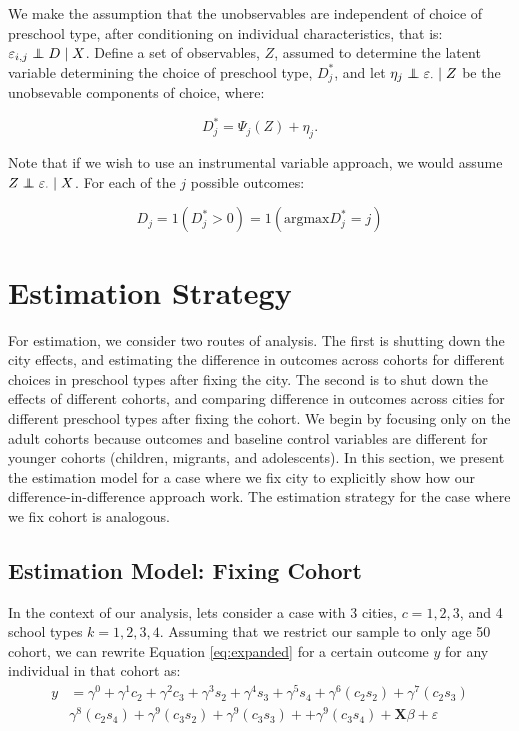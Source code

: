 \documentclass[11pt]{article}
\newcommand\independent{\protect\mathpalette{\protect\independenT}{\perp}}
\def\independenT#1#2{\mathrel{\rlap{$#1#2$}\mkern2mu{#1#2}}}
\begin{document}
We make the assumption that the unobservables are independent of choice of preschool type, after conditioning on individual characteristics, that is: $\varepsilon_{i,j} \independent D \mid X$. Define a set of observables, $Z$, assumed to determine the latent variable determining the choice of preschool type, $D^{*}_j$, and let $\eta_j \independent \varepsilon_{\cdot} \mid Z$ be the unobsevable components of choice, where:

\begin{equation}
D^{*}_j= \Psi_j(Z) + \eta_j.
\end{equation}

\noindent Note that if we wish to use an instrumental variable approach, we would assume $Z \independent \varepsilon_{\cdot} \mid X$. For each of the $j$ possible outcomes: 

\begin{equation}
D_{j} = 1(D^{*}_{j} > 0) = 1(\mathrm{argmax} D^{*}_{j} = j) 
\end{equation}


\section{Estimation Strategy}
For estimation, we consider two routes of analysis. The first is shutting down the city effects, and estimating the difference in outcomes across cohorts for different choices in preschool types after fixing the city. The second is to shut down the effects of different cohorts, and comparing difference in outcomes across cities for different preschool types after fixing the cohort. We begin by focusing only on the adult cohorts because outcomes and baseline control variables are different for younger cohorts (children, migrants, and adolescents). In this section, we present the estimation model for a case where we fix city to explicitly show how our difference-in-difference approach work. The estimation strategy for the case where we fix cohort is analogous. 

\subsection{Estimation Model: Fixing Cohort}


In the context of our analysis, lets consider a case with 3 cities, $c = 1, 2, 3$, and 4 school types $k = 1,2,3,4$. Assuming that we restrict our sample to only age 50 cohort, we can rewrite Equation \ref{eq:expanded} for a certain outcome $y$ for any individual in that cohort as:
\begin{eqnarray}  \label{eq:specific2}
y & = \gamma^0 + \gamma^1 c_2 + \gamma^2 c_3 + \gamma^3 s_2 + \gamma^4 s_3 + \gamma^5 s_4  + \gamma^6 ({c_2}{s_2}) + \gamma^7 ({c_2}{s_3})  \nonumber \\
 & \gamma^8 ({c_2}{s_4}) + \gamma^9 ({c_3}{s_2}) + \gamma^9 ({c_3}{s_3}) +  + \gamma^9 ({c_3}{s_4}) + \mathbf{X}\beta + \varepsilon  
\end{eqnarray}
\end{document}
